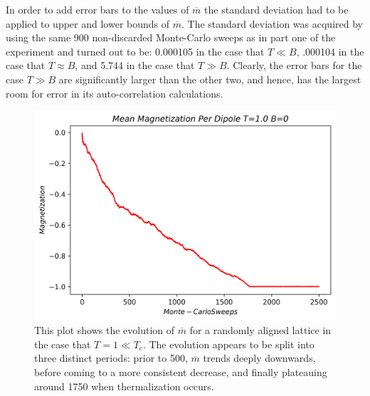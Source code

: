 \documentclass[twocolumn]{article}
\begin{document}
\hspace{-3.8mm}In order to add error bars to the values of $\overline{m}$ the standard deviation had to be applied to upper and lower bounds of $\overline{m}$. The standard deviation was acquired by using the same 900 non-discarded Monte-Carlo sweeps as in part one of the experiment and turned out to be: 0.000105 in the case that $T \ll B$, .000104 in the case that $T \approx B$, and 5.744 in the case that $T \gg B$. Clearly, the error bars for the case $T \gg B$ are significantly larger than the other two, and hence, has the largest room for error in its auto-correlation calculations.
\begin{figure}[H]
\caption{This plot shows the evolution of $\overline{m}$ for a randomly aligned lattice in the case that $T=1 \ll T_c$. The evolution appears to be split into three distinct periods: prior to 500, $\overline{m}$ trends deeply downwards, before coming to a more consistent decrease, and finally plateauing around 1750 when thermalization occurs.}
\centering
\includegraphics[scale=.5]{MagnetizationT=1B=0}
\end{figure}
\end{document}
